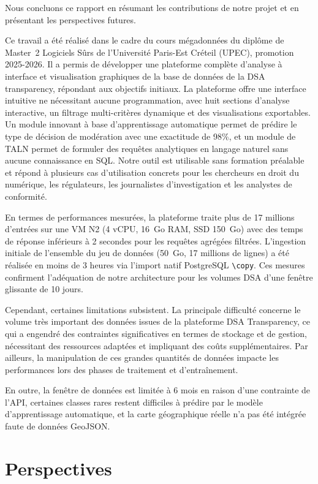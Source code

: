 \documentclass[10pt,twocolumn,a4paper]{article}
\begin{document}
Nous concluons ce rapport en résumant les contributions de notre projet et en présentant les perspectives futures.

Ce travail a été réalisé dans le cadre du cours mégadonnées du diplôme de Master~2 Logiciels Sûrs de l'Université Paris-Est Créteil (UPEC), promotion 2025-2026. Il a permis de développer une plateforme complète d'analyse à interface et visualisation graphiques de la base de données de la DSA transparency, répondant aux objectifs initiaux. La plateforme offre une interface intuitive ne nécessitant aucune programmation, avec huit sections d'analyse interactive, un filtrage multi-critères dynamique et des visualisations exportables. Un module innovant à base d'apprentissage automatique permet de prédire le type de décision de modération avec une exactitude de 98\%, et un module de TALN permet de formuler des requêtes analytiques en langage naturel sans aucune connaissance en SQL. Notre outil est utilisable sans formation préalable et répond à plusieurs cas d'utilisation concrets pour les chercheurs en droit du numérique, les régulateurs, les journalistes d'investigation et les analystes de conformité.

En termes de performances mesurées, la plateforme traite plus de 17 millions d'entrées sur une VM N2 (4 vCPU, 16~Go RAM, SSD 150~Go) avec des temps de réponse inférieurs à 2 secondes pour les requêtes agrégées filtrées. L'ingestion initiale de l'ensemble du jeu de données (50~Go, 17 millions de lignes) a été réalisée en moins de 3 heures via l'import natif PostgreSQL \texttt{\textbackslash copy}. Ces mesures confirment l'adéquation de notre architecture pour les volumes DSA d'une fenêtre glissante de 10 jours.

Cependant, certaines limitations subsistent. La principale difficulté concerne le volume très important des données issues de la plateforme DSA Transparency, ce qui a engendré des contraintes significatives en termes de stockage et de gestion, nécessitant des ressources adaptées et impliquant des coûts supplémentaires. Par ailleurs, la manipulation de ces grandes quantités de données impacte les performances lors des phases de traitement et d'entraînement.

En outre, la fenêtre de données est limitée à 6 mois en raison d'une contrainte de l'API, certaines classes rares restent difficiles à prédire par le modèle d'apprentissage automatique, et la carte géographique réelle n'a pas été intégrée faute de données GeoJSON.

\section{Perspectives}
\end{document}
